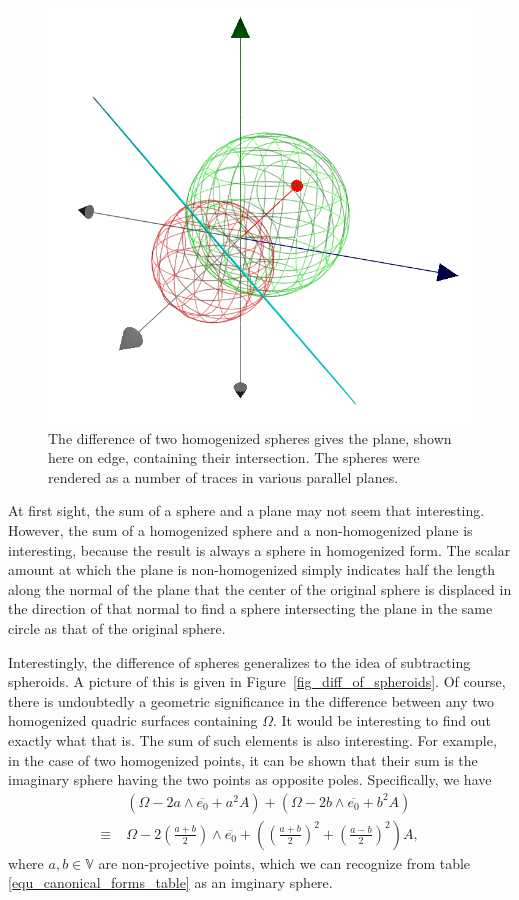 \documentclass{birkjour}
\theoremstyle{definition}
\theoremstyle{remark}
\numberwithin{equation}{section}
\newcommand{\V}{\mathbb{V}}
\newcommand{\Alpha}{A}
\begin{document}
\begin{figure}
\includegraphics[scale=0.5]{DiffOfSpheres}
\caption{The difference of two homogenized spheres gives the plane, shown here on edge,
containing their intersection.  The spheres were rendered as a number of traces in
various parallel planes.}
\label{fig_diff_of_spheres}
\end{figure}

At first sight, the sum of a sphere and a plane may not seem that interesting.
However, the sum of a homogenized sphere and a non-homogenized plane is
interesting, because the result is always a sphere in homogenized form.  The
scalar amount at which the plane is non-homogenized simply indicates half
the length along the normal of the plane that the center of the original sphere
is displaced in the direction of that normal to find a sphere intersecting the
plane in the same circle as that of the original sphere.

Interestingly, the difference of spheres generalizes to the idea of subtracting
spheroids.  A picture of this is given in Figure~\ref{fig_diff_of_spheroids}.
Of course, there is undoubtedly a geometric significance in the difference
between any two homogenized quadric surfaces containing $\Omega$.  It
would be interesting to find out exactly what that is.  The sum of such
elements is also interesting.  For example, in the case of two homogenized
points, it can be shown that their sum is the imaginary sphere having the
two points as opposite poles.  Specifically, we have
\begin{align}
 & \left(\Omega-2a\wedge\overline{e_0}+a^2\Alpha\right) +
\left(\Omega-2b\wedge\overline{e_0}+b^2\Alpha\right) \\
\equiv\;& \Omega-2\left(\frac{a+b}{2}\right)\wedge\overline{e_0} +
\left(\left(\frac{a+b}{2}\right)^2+\left(\frac{a-b}{2}\right)^2\right)\Alpha,
\end{align}
where $a,b\in\V$ are non-projective points, which we can recognize
from table \eqref{equ_canonical_forms_table} as an imginary sphere.
\end{document}

